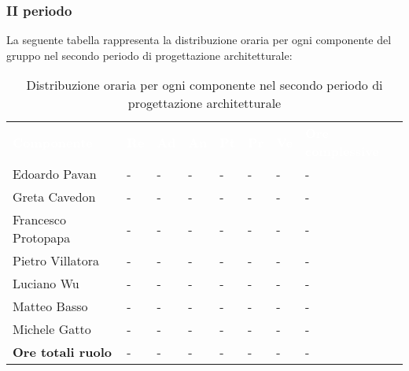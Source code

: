 \subsubsection{II periodo}
La seguente tabella rappresenta la distribuzione oraria per ogni componente del gruppo nel secondo periodo di progettazione architetturale:
\begin{table}[!htbp]
\begin{center}
\renewcommand{\arraystretch}{1.25}
\begin{tabular}{ m{}<{\centering}  m{}<{\centering} m{}<{\centering} m{}<{\centering}  m{}<{\centering}  m{}<{\centering}  m{}<{\centering}  m{}<{\centering}   }
	\rowcolor{darkblue}
	\textcolor{white}{\textbf{Componente}} &\textcolor{white}{\textbf{Re}}&\textcolor{white}{\textbf{Ad}}&\textcolor{white}{\textbf{An}}&\textcolor{white}{\textbf{Pt}}&\textcolor{white}{\textbf{Pr}}&\textcolor{white}{\textbf{Ve}}&\textcolor{white}{\textbf{Ore complessive}}\\ 

	Edoardo Pavan & - & - & - & - & - & - & -\\	

	\rowcolor{gray!10} Greta Cavedon & - & - & - & - & - & - & -\\
	
	Francesco Protopapa & - & - & - & - & - & - & -\\
	
	\rowcolor{gray!10} Pietro Villatora & - & - & - & - & - & - & -\\
	
	Luciano Wu & - & - & - & - & - & - & -\\
	
	\rowcolor{gray!10} Matteo Basso & - & - & - & - & - & - & -\\
	
	Michele Gatto & - & - & - & - & - & - & -\\
	
	\rowcolor{gray!10} \textbf{Ore totali ruolo} & - & - & - & - & - & - & -\\

\end{tabular}
\caption{Distribuzione oraria per ogni componente nel secondo periodo di progettazione architetturale}
\end{center}
\end{table}

